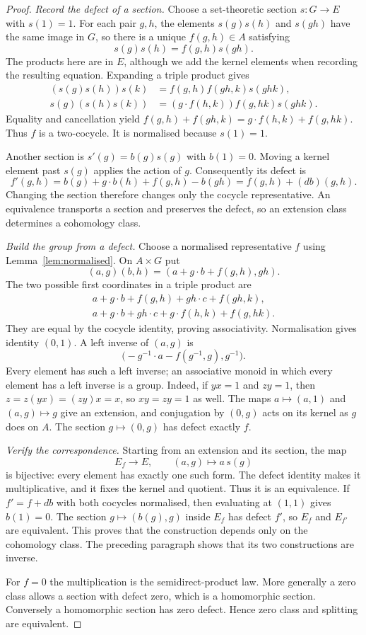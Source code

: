 \begin{proof}
\emph{Record the defect of a section.} Choose a set-theoretic section $s:G\to E$ with $s(1)=1$. For each pair $g,h$, the elements $s(g)s(h)$ and $s(gh)$ have the same image in $G$, so there is a unique $f(g,h)\in A$ satisfying
\[
s(g)s(h)=f(g,h)s(gh).
\]
The products here are in $E$, although we add the kernel elements when recording the resulting equation. Expanding a triple product gives
\[
\begin{aligned}
(s(g)s(h))s(k)&=f(g,h)f(gh,k)s(ghk),\\
s(g)(s(h)s(k))&=(g\cdot f(h,k))f(g,hk)s(ghk).
\end{aligned}
\]
Equality and cancellation yield
$f(g,h)+f(gh,k)=g\cdot f(h,k)+f(g,hk)$. Thus $f$ is a two-cocycle. It is normalised because $s(1)=1$.

Another section is $s'(g)=b(g)s(g)$ with $b(1)=0$. Moving a kernel element past $s(g)$ applies the action of $g$. Consequently its defect is
\[
f'(g,h)=b(g)+g\cdot b(h)+f(g,h)-b(gh)=f(g,h)+(db)(g,h).
\]
Changing the section therefore changes only the cocycle representative. An equivalence transports a section and preserves the defect, so an extension class determines a cohomology class.

\emph{Build the group from a defect.} Choose a normalised representative $f$ using Lemma~\ref{lem:normalised}. On $A\times G$ put
\[
(a,g)(b,h)=(a+g\cdot b+f(g,h),gh).
\]
The two possible first coordinates in a triple product are
\[
\begin{aligned}
a+g\cdot b+f(g,h)+gh\cdot c+f(gh,k),\\
a+g\cdot b+gh\cdot c+g\cdot f(h,k)+f(g,hk).
\end{aligned}
\]
They are equal by the cocycle identity, proving associativity. Normalisation gives identity $(0,1)$. A left inverse of $(a,g)$ is
\[
\bigl(-g^{-1}\cdot a-f(g^{-1},g),g^{-1}\bigr).
\]
Every element has such a left inverse; an associative monoid in which every element has a left inverse is a group. Indeed, if $yx=1$ and $zy=1$, then $z=z(yx)=(zy)x=x$, so $xy=zy=1$ as well.
The maps $a\mapsto(a,1)$ and $(a,g)\mapsto g$ give an extension, and conjugation by $(0,g)$ acts on its kernel as $g$ does on $A$. The section $g\mapsto(0,g)$ has defect exactly $f$.

\emph{Verify the correspondence.} Starting from an extension and its section, the map
\[
E_f\longrightarrow E,\qquad(a,g)\longmapsto a\,s(g)
\]
is bijective: every element has exactly one such form. The defect identity makes it multiplicative, and it fixes the kernel and quotient. Thus it is an equivalence.
If $f'=f+db$ with both cocycles normalised, then evaluating at $(1,1)$ gives $b(1)=0$. The section $g\mapsto(b(g),g)$ inside $E_f$ has defect $f'$, so $E_f$ and $E_{f'}$ are equivalent. This proves that the construction depends only on the cohomology class. The preceding paragraph shows that its two constructions are inverse.

For $f=0$ the multiplication is the semidirect-product law. More generally a zero class allows a section with defect zero, which is a homomorphic section. Conversely a homomorphic section has zero defect. Hence zero class and splitting are equivalent.
\end{proof}

